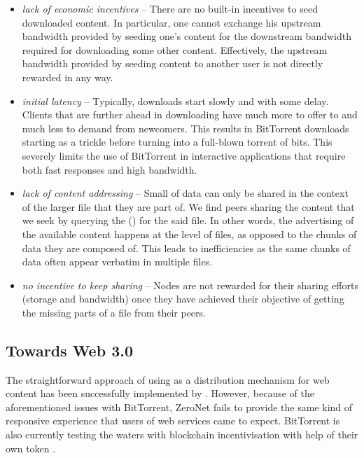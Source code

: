 \begin{itemize}
\item \emph{lack of economic incentives} -- 
There are no built-in incentives to seed downloaded content. In particular, one cannot exchange his upstream bandwidth provided by seeding one's content for the downstream bandwidth required for downloading some other content. Effectively, the upstream bandwidth provided by seeding content to another user is not directly rewarded in any way.
\item \emph{initial latency} -- 
 Typically, downloads start slowly and with some delay. Clients that are further ahead in downloading have much more to offer to and much less to demand from newcomers. This results in BitTorrent downloads starting as a trickle before turning into a full-blown torrent of bits. This severely limits the use of BitTorrent in interactive applications that require both fast responses and high bandwidth.
\item \emph{lack of content addressing} -- Small  of data can only be shared in the context of the larger file that they are part of. We find peers sharing the content that we seek by querying the  () for the said file. In other words, the advertising of the available content happens at the level of files, as opposed to the chunks of data they are composed of. This leads to inefficiencies as the same chunks of data often appear verbatim in multiple files. 
\item \emph{no incentive to keep sharing} --
Nodes are not rewarded for their sharing efforts (storage and bandwidth) once they have achieved their objective of getting the missing parts of a file from their peers.
\end{itemize}

\subsection{Towards Web 3.0 \statusgreen}\label{sec:towards-web3}

The straightforward approach of using  as a distribution mechanism for web content has been successfully implemented by  \cite{zeronet}. However, because of the aforementioned issues with BitTorrent, ZeroNet fails to provide the same kind of responsive experience that users of web services came to expect. BitTorrent is also currently testing the waters with blockchain incentivisation with help of their own token \cite{tron2018,bittorrent2019}.

